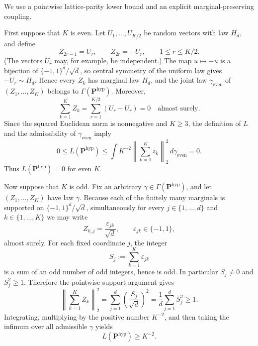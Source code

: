 We use a pointwise lattice-parity lower bound and an explicit marginal-preserving coupling.

First suppose that \(K\) is even.  Let \(U_1,\ldots,U_{K/2}\) be random vectors with law \(H_d\), and define
\[
 Z_{2r-1}=U_r,
 \qquad
 Z_{2r}=-U_r,
 \qquad 1\le r\le K/2.
\]
(The vectors \(U_r\) may, for example, be independent.)  The map \(u\mapsto-u\) is a bijection of \(\{-1,1\}^d/\sqrt d\), so central symmetry of the uniform law gives \(-U_r\sim H_d\).  Hence every \(Z_k\) has marginal law \(H_d\), and the joint law \(\gamma_{\mathrm{even}}\) of \((Z_1,\ldots,Z_K)\) belongs to \(\Gamma(\mathbf P^{\mathrm{hyp}})\).  Moreover,
\[
 \sum_{k=1}^K Z_k
 =\sum_{r=1}^{K/2}(U_r-U_r)=0
 \quad\text{almost surely}.
\]
Since the squared Euclidean norm is nonnegative and \(K\ge3\), the definition of \(L\) and the admissibility of \(\gamma_{\mathrm{even}}\) imply
\[
 0\le L(\mathbf P^{\mathrm{hyp}})
 \le \int K^{-2}\left\|\sum_{k=1}^Kz_k\right\|_2^2
 \,d\gamma_{\mathrm{even}}=0.
\]
Thus \(L(\mathbf P^{\mathrm{hyp}})=0\) for even \(K\).

Now suppose that \(K\) is odd.  Fix an arbitrary \(\gamma\in\Gamma(\mathbf P^{\mathrm{hyp}})\), and let \((Z_1,\ldots,Z_K)\) have law \(\gamma\).  Because each of the finitely many marginals is supported on \(\{-1,1\}^d/\sqrt d\), simultaneously for every \(j\in\{1,\ldots,d\}\) and \(k\in\{1,\ldots,K\}\) we may write
\[
 Z_{k,j}=\frac{\varepsilon_{jk}}{\sqrt d},
 \qquad \varepsilon_{jk}\in\{-1,1\},
\]
almost surely.  For each fixed coordinate \(j\), the integer
\[
 S_j:=\sum_{k=1}^K\varepsilon_{jk}
\]
is a sum of an odd number of odd integers, hence is odd.  In particular \(S_j\ne0\) and \(S_j^2\ge1\).  Therefore the pointwise support argument gives
\[
 \left\|\sum_{k=1}^K Z_k\right\|_2^2
 =\sum_{j=1}^d\left(\frac{S_j}{\sqrt d}\right)^2
 =\frac1d\sum_{j=1}^d S_j^2
 \ge1.
\]
Integrating, multiplying by the positive number \(K^{-2}\), and then taking the infimum over all admissible \(\gamma\) yields
\[
 L(\mathbf P^{\mathrm{hyp}})\ge K^{-2}.
\]

